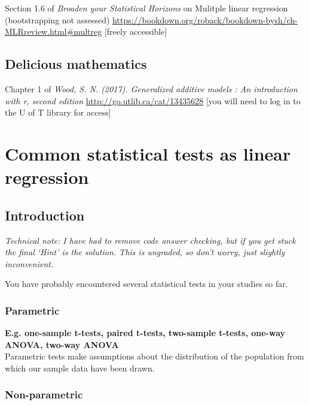 \documentclass[
]{book}
\begin{document}
Section 1.6 of \emph{Broaden your Statistical Horizons} on Mulitple linear regression (bootstrapping not assessed) \url{https://bookdown.org/roback/bookdown-bysh/ch-MLRreview.html\#multreg} {[}freely accessible{]}

\hypertarget{delicious-mathematics}{%
\subsection{Delicious mathematics}\label{delicious-mathematics}}

Chapter 1 of \emph{Wood, S. N. (2017). Generalized additive models : An introduction with r, second edition}
\url{http://go.utlib.ca/cat/13435628} {[}you will need to log in to the U of T library for access{]}

\hypertarget{common-statistical-tests-as-linear-regression}{%
\section{Common statistical tests as linear regression}\label{common-statistical-tests-as-linear-regression}}

\hypertarget{introduction}{%
\subsection{Introduction}\label{introduction}}

\emph{Technical note: I have had to remove code answer checking, but if you get stuck the final `Hint' is the solution. This is ungraded, so don't worry, just slightly inconvenient.}

You have probably encountered several statistical tests in your studies so far.

\hypertarget{parametric}{%
\subsubsection{Parametric}\label{parametric}}

\textbf{E.g. one-sample t-tests, paired t-tests, two-sample t-tests, one-way ANOVA, two-way ANOVA}\\
Parametric tests make assumptions about the distribution of the population from which our sample data have been drawn.

\hypertarget{non-parametric}{%
\subsubsection{Non-parametric}\label{non-parametric}}
\end{document}
